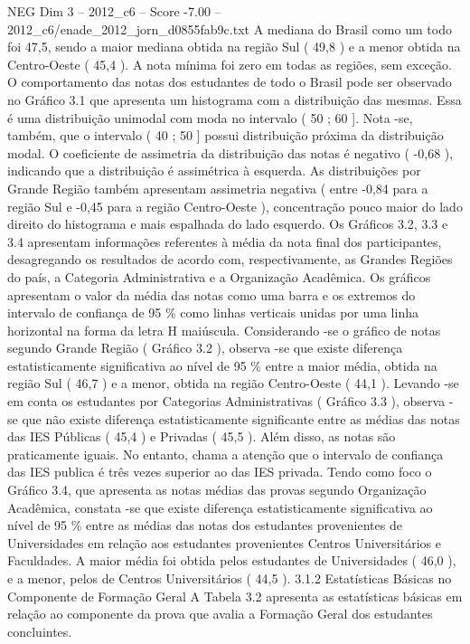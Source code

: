 \begin{textsample}{NEG Dim 3 – 2012\_c6 – Score -7.00 – 2012\_c6/enade\_2012\_jorn\_d0855fab9c.txt}
A mediana do Brasil como um todo foi 47,5, sendo a maior mediana obtida na região Sul ( 49,8 ) e a menor obtida na Centro-Oeste ( 45,4 ).
A nota mínima foi zero em todas as regiões, sem exceção.
O comportamento das notas dos estudantes de todo o Brasil pode ser observado no Gráfico 3.1 que apresenta um histograma com a distribuição das mesmas.
Essa é uma distribuição unimodal com moda no intervalo ( 50 ; 60 ].
Nota -se, também, que o intervalo ( 40 ; 50 ] possui distribuição próxima da distribuição modal.
O coeficiente de assimetria da distribuição das notas é negativo ( -0,68 ), indicando que a distribuição é assimétrica à esquerda.
As distribuições por Grande Região também apresentam assimetria negativa ( entre -0,84 para a região Sul e -0,45 para a região Centro-Oeste ), concentração pouco maior do lado direito do histograma e mais espalhada do lado esquerdo.
Os Gráficos 3.2, 3.3 e 3.4 apresentam informações referentes à média da nota final dos participantes, desagregando os resultados de acordo com, respectivamente, as Grandes Regiões do país, a Categoria Administrativa e a Organização Acadêmica.
Os gráficos apresentam o valor da média das notas como uma barra e os extremos do intervalo de confiança de 95 \% como linhas verticais unidas por uma linha horizontal na forma da letra H maiúscula.
Considerando -se o gráfico de notas segundo Grande Região ( Gráfico 3.2 ), observa -se que existe diferença estatisticamente significativa ao nível de 95 \% entre a maior média, obtida na região Sul ( 46,7 ) e a menor, obtida na região Centro-Oeste ( 44,1 ).
Levando -se em conta os estudantes por Categorias Administrativas ( Gráfico 3.3 ), observa -se que não existe diferença estatisticamente significante entre as médias das notas das IES Públicas ( 45,4 ) e Privadas ( 45,5 ).
Além disso, as notas são praticamente iguais.
No entanto, chama a atenção que o intervalo de confiança das IES publica é três vezes superior ao das IES privada.
Tendo como foco o Gráfico 3.4, que apresenta as notas médias das provas segundo Organização Acadêmica, constata -se que existe diferença estatisticamente significativa ao nível de 95 \% entre as médias das notas dos estudantes provenientes de Universidades em relação aos estudantes provenientes Centros Universitários e Faculdades.
A maior média foi obtida pelos estudantes de Universidades ( 46,0 ), e a menor, pelos de Centros Universitários ( 44,5 ). 3.1.2 Estatísticas Básicas no Componente de Formação Geral A Tabela 3.2 apresenta as estatísticas básicas em relação ao componente da prova que avalia a Formação Geral dos estudantes concluintes.

\end{textsample}
